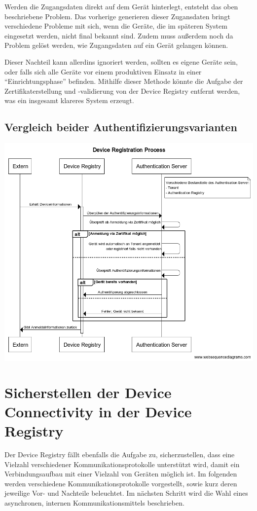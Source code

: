 Werden die Zugangsdaten direkt auf dem Gerät hinterlegt, entsteht das oben beschriebene Problem. Das vorherige generieren dieser Zugansdaten bringt verschiedene Probleme mit sich, wenn die Geräte, die im späteren System eingesetzt werden, nicht final bekannt sind. Zudem muss außerdem noch da Problem gelöst werden, wie Zugangsdaten auf ein Gerät gelangen können.

Dieser Nachteil kann allerdins ignoriert werden, sollten es eigene Geräte sein, oder falls sich alle Geräte vor einem produktiven Einsatz in einer \enquote{Einrichtungsphase} befinden. Mithilfe dieser Methode könnte die Aufgabe der Zertifikaterstellung und -validierung von der Device Registry entfernt werden, was ein insgesamt klareres System erzeugt.

\subsection{Vergleich beider Authentifizierungsvarianten}

\includegraphics[width=0.8\linewidth]{img/device_registration.png}

\section{Sicherstellen der Device Connectivity in der Device Registry}

Der Device Registry fällt ebenfalls die Aufgabe zu, sicherzustellen, dass eine Vielzahl verschiedener Kommunikationsprotokolle unterstützt wird, damit ein Verbindungsaufbau mit einer Vielzahl von Geräten möglich ist. Im folgenden werden verschiedene Kommunikationsprotokolle vorgestellt, sowie kurz deren jeweilige Vor- und Nachteile beleuchtet. Im nächsten Schritt wird die Wahl eines asynchronen, internen Kommunikationsmittels beschrieben.


